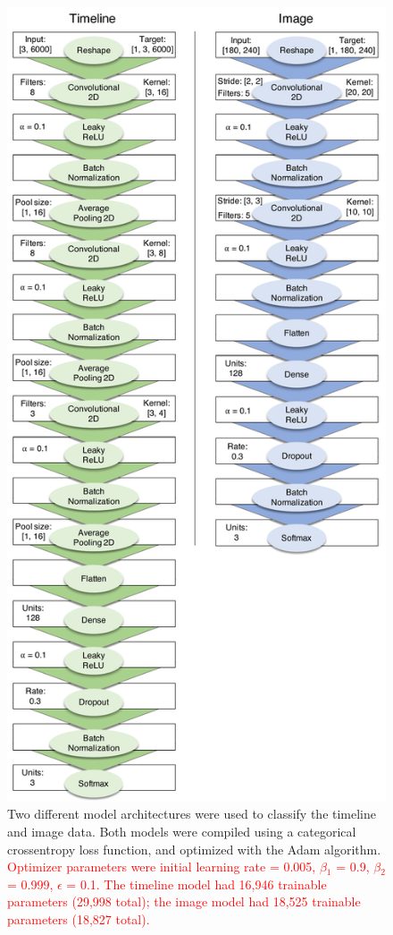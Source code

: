 \documentclass[
  english,
  man, donotrepeattitle,floatsintext]{apa6}
\begin{document}
\begin{figure}
\centering
\includegraphics{figures/models.pdf}
\caption{\label{fig:models}Two different model architectures were used to classify the timeline and image data. Both models were compiled using a categorical crossentropy loss function, and optimized with the Adam algorithm. \textcolor{red}{Optimizer parameters were initial learning rate = 0.005, $\beta$$_1$ = 0.9, $\beta$$_2$ = 0.999, $\epsilon$ = 0.1. The timeline model had 16,946 trainable parameters (29,998 total); the image model had 18,525 trainable parameters (18,827 total).}}
\end{figure}
\end{document}
